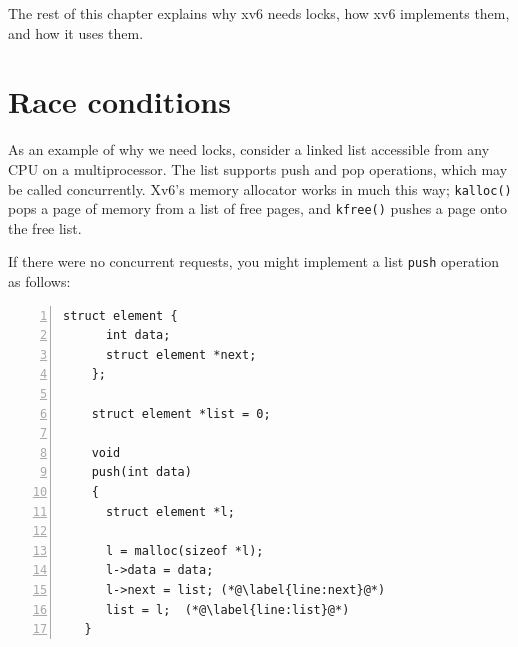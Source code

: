 The rest of this chapter explains why xv6 needs locks, how xv6
implements them, and how it uses them.


% 

\section{Race conditions}

As an example of why we need locks,
consider a linked list accessible from any
CPU on a multiprocessor.
The list supports push and pop operations, which
may be called concurrently.
Xv6's memory allocator works in much this way;
\lstinline{kalloc()}
pops a page of memory from a list of free pages,
and
\lstinline{kfree()}
pushes a page onto the free list.

If there were no
concurrent requests, you might implement a list
\lstinline{push}
operation as follows:
\begin{lstlisting}[numbers=left,firstnumber=1]
    struct element {
      int data;
      struct element *next;
    };
    
    struct element *list = 0;
    
    void
    push(int data)
    {
      struct element *l;
   
      l = malloc(sizeof *l);
      l->data = data;
      l->next = list; (*@\label{line:next}@*)
      list = l;  (*@\label{line:list}@*)
   }
\end{lstlisting}

